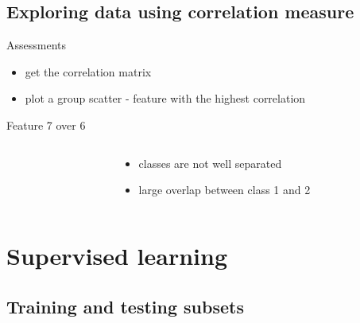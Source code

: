 \documentclass{beamer}
\begin{document}

\subsection{Exploring data using correlation measure}

\begin{frame}{Assessments}
  \begin{itemize}
  \item{
    get the correlation matrix 
    }
  \item{
    plot a group scatter - feature with the highest correlation
  }
  \end{itemize}
\end{frame}

\begin{frame}{Feature 7 over 6}
\begin{columns}[t]
\begin{column}{.5\textwidth}
\end{column}
\begin{column}{.5\textwidth}
\begin{itemize}
  \item{
    classes are not well separated 
    }
  \item{
    large overlap between class 1 and 2
  }
  \end{itemize}
\end{column}
\end{columns}
\end{frame}


\section{Supervised learning}
\subsection{Training and testing subsets}
\end{document}
